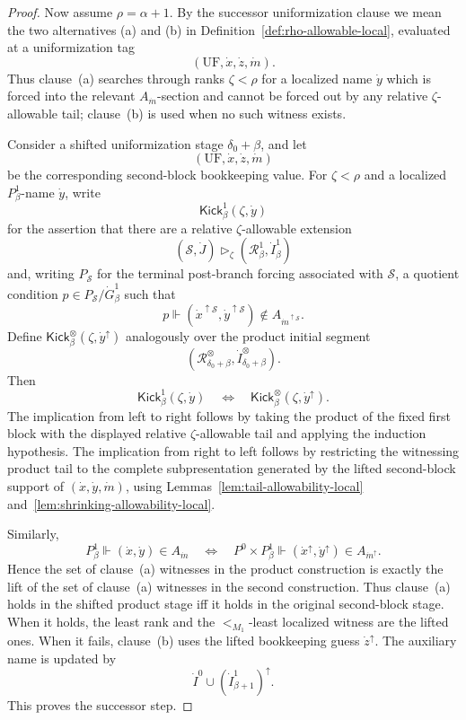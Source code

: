 \documentclass[10pt,a4paper]{amsart}
\begin{document}
\begin{proof}
Now assume \(\rho=\alpha+1\).  By the successor uniformization clause we mean
the two alternatives (a) and (b) in Definition~\ref{def:rho-allowable-local},
evaluated at a uniformization tag
\[
   (\mathrm{UF},\dot x,\dot z,\dot m).
\]
Thus clause~(a) searches through ranks \(\zeta<\rho\) for a localized name
\(\dot y\) which is forced into the relevant \(A_{\dot m}\)-section and cannot
be forced out by any relative \(\zeta\)-allowable tail; clause~(b) is used when
no such witness exists.

Consider a shifted uniformization stage \(\delta_0+\beta\), and let
\[
   (\mathrm{UF},\dot x,\dot z,\dot m)
\]
be the corresponding second-block bookkeeping value.  For \(\zeta<\rho\) and a
localized \(P^1_\beta\)-name \(\dot y\), write
\[
   \mathsf{Kick}^1_\beta(\zeta,\dot y)
\]
for the assertion that there are a relative \(\zeta\)-allowable extension
\[
   (\mathcal S,\dot J)\triangleright_\zeta
   (\mathcal R^1_\beta,\dot I^1_\beta)
\]
and, writing \(P_{\mathcal S}\) for the terminal post-branch forcing associated
with \(\mathcal S\), a quotient condition \(p\in P_{\mathcal S}/\dot G^1_\beta\)
such that
\[
   p\Vdash
   (\dot x^{\uparrow\mathcal S},
    \dot y^{\uparrow\mathcal S})
      \notin A_{\dot m^{\uparrow\mathcal S}}.
\]
Define \(\mathsf{Kick}^\otimes_\beta(\zeta,\dot y^\uparrow)\) analogously over
the product initial segment
\[
   (\mathcal R^\otimes_{\delta_0+\beta},
    \dot I^\otimes_{\delta_0+\beta}).
\]
Then
\[
   \mathsf{Kick}^1_\beta(\zeta,\dot y)
   \quad\Longleftrightarrow\quad
   \mathsf{Kick}^\otimes_\beta(\zeta,\dot y^\uparrow).
\]
The implication from left to right follows by taking the product of the fixed
first block with the displayed relative \(\zeta\)-allowable tail and applying
the induction hypothesis.  The implication from right to left follows by
restricting the witnessing product tail to the complete subpresentation
generated by the lifted second-block support of
\((\dot x,\dot y,\dot m)\), using Lemmas~\ref{lem:tail-allowability-local}
and~\ref{lem:shrinking-allowability-local}.

Similarly,
\[
   P^1_\beta\Vdash (\dot x,\dot y)\in A_{\dot m}
   \quad\Longleftrightarrow\quad
   P^0\times P^1_\beta
      \Vdash
      (\dot x^\uparrow,\dot y^\uparrow)\in A_{\dot m^\uparrow}.
\]
Hence the set of clause~(a) witnesses in the product construction is exactly
the lift of the set of clause~(a) witnesses in the second construction.  Thus
clause~(a) holds in the shifted product stage iff it holds in the original
second-block stage.  When it holds, the least rank and the \(<_{M_1}\)-least
localized witness are the lifted ones.  When it fails, clause~(b) uses the
lifted bookkeeping guess \(\dot z^\uparrow\).  The auxiliary name is updated by
\[
   \dot I^0\cup(\dot I^1_{\beta+1})^\uparrow.
\]
This proves the successor step.


\end{proof}
\end{document}
